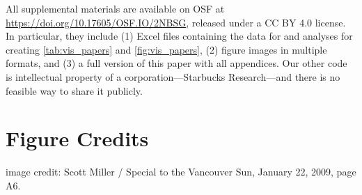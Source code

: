 \documentclass[journal]{vgtc}                %
\begin{document}
All supplemental materials are available on OSF at \url{https://doi.org/10.17605/OSF.IO/2NBSG}, released under a CC BY 4.0 license.
In particular, they include (1) Excel files containing the data for and analyses for creating \cref{tab:vis_papers} and \cref{fig:vis_papers}, (2) figure images in multiple formats, and (3) a full version of this paper with all appendices.
Our other code is intellectual property of a corporation---Starbucks Research---and there is no feasible way to share it publicly.


\section*{Figure Credits}

 image credit: Scott Miller / Special to the Vancouver Sun, January 22, 2009, page A6.









%

%
%
%


\end{document}
